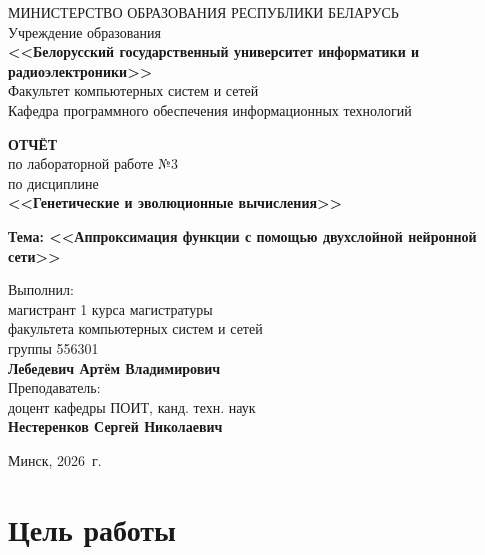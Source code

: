 \documentclass[14pt,a4paper]{extarticle}
\begin{document}
\thispagestyle{empty}

\begin{center}
МИНИСТЕРСТВО ОБРАЗОВАНИЯ РЕСПУБЛИКИ БЕЛАРУСЬ\\[0.5em]
Учреждение образования\\[0.5em]
\textbf{<<Белорусский государственный университет информатики и радиоэлектроники>>}\\[2em]

Факультет компьютерных систем и сетей\\[0.5em]
Кафедра программного обеспечения информационных технологий
\end{center}

\vspace{3em}

\begin{center}
\textbf{ОТЧЁТ}\\[0.5em]
по лабораторной работе №3\\[0.5em]
по дисциплине\\[0.5em]
\textbf{<<Генетические и эволюционные вычисления>>}

\textbf{Тема: <<Аппроксимация функции с помощью двухслойной нейронной сети>>}
\end{center}

\vspace{4em}

\hfill\begin{minipage}{0.55\textwidth}
Выполнил:\\
магистрант 1 курса магистратуры\\
факультета компьютерных систем и сетей\\
группы 556301\\[0.3em]
\textbf{Лебедевич Артём Владимирович}\\[1.2em]
Преподаватель:\\
доцент кафедры ПОИТ, канд. техн. наук\\
\textbf{Нестеренков Сергей Николаевич}
\end{minipage}

\vfill

\begin{center}
Минск, 2026~г.
\end{center}

\newpage

\tableofcontents

\newpage

\section{Цель работы}
\end{document}
